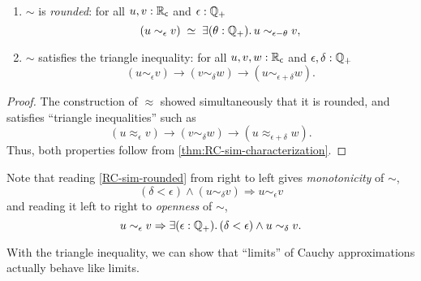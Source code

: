 \begin{cor}\ 
  \begin{enumerate}
  \item \label{RC-sim-rounded}
    $\sim$ is \emph{rounded}:
    for all $u, v : \mathbb{R}_\mathsf{c}$ and $\epsilon : \mathbb{Q}_{+}$
    \begin{equation*}
      \eqvspaced{
        (u \sim_\epsilon v)
      }{
        \exis{\theta : \Qp} u \sim_{\epsilon - \theta} v
      },
    \end{equation*}
  \item \label{item:RC-sim-triangle}
    $\sim$ satisfies the triangle inequality: for all $u,v,w:\mathbb{R}_\mathsf{c}$ and $\epsilon,\delta:\mathbb{Q}_{+}$
    \begin{equation*}
      (u\sim_\epsilon v) \to (v\sim_\delta w) \to (u\sim_{\epsilon+\delta} w).
    \end{equation*}
  \end{enumerate}
\end{cor}
\begin{proof}
  The construction of $\approx$ showed simultaneously that it is rounded, and satisfies ``triangle inequalities'' such as
  \[ (u\approx_\epsilon v) \to (v\sim_\delta w) \to (u\approx_{\epsilon+\delta} w). \]
  Thus, both properties follow from \autoref{thm:RC-sim-characterization}.
\end{proof}

Note that reading \autoref{RC-sim-rounded} from right to left gives \emph{monotonicity} of $\sim$,
%
\begin{equation*}
  (\delta < \epsilon) \land (u \sim_\delta v) \Rightarrow u \sim_\epsilon v
\end{equation*}
%
and reading it left to right to \emph{openness} of $\sim$,
%
\begin{equation*}
  u \sim_\epsilon v \Rightarrow \exis{\epsilon : \Qp} (\delta < \epsilon) \land u \sim_\delta v.
\end{equation*}

With the triangle inequality, we can show that ``limits'' of Cauchy approximations actually behave like limits.


